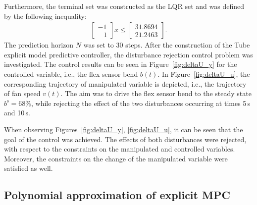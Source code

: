 \documentclass[letterpaper, 10 pt, conference]{ieeeconf}
\begin{document}
Furthermore, the terminal set was constructed as the LQR set and was defined by the following inequality:
\begin{eqnarray}
	\label{eq:setup_terminal_set}
	\begin{bmatrix}
	-1 \\	
	\,\,\,\,\, 1
	\end{bmatrix} x \le 
	\begin{bmatrix}
		31.8694\\	
		21.2463
	\end{bmatrix}.
\end{eqnarray}
The prediction horizon $N$ was set to 30 steps. 
After the construction of the Tube explicit model predictive controller, the disturbance rejection control problem was investigated. The control results can be seen in Figure~\ref{fig:deltaU_y} for the controlled variable, i.e., the flex sensor bend $b(t)$. In Figure~\ref{fig:deltaU_u}, the corresponding trajectory of manipulated variable is depicted, i.e., the trajectory of fan speed $v(t)$. The aim was to drive the flex sensor bend to the steady state $ b^\mathrm{s} = 68\%$, while rejecting the effect of the two disturbances occurring at times 5\,s and 10\,s. 

When observing Figures~\ref{fig:deltaU_y}, \ref{fig:deltaU_u}, it can be seen that the goal of the control was achieved. The effects of both disturbances were rejected, with respect to the constraints on the manipulated and controlled variables. Moreover, the constraints on the change of the manipulated variable were satisfied as well.

\subsection{Polynomial approximation of explicit MPC}
\label{sec:polynomial_exp}
\end{document}
